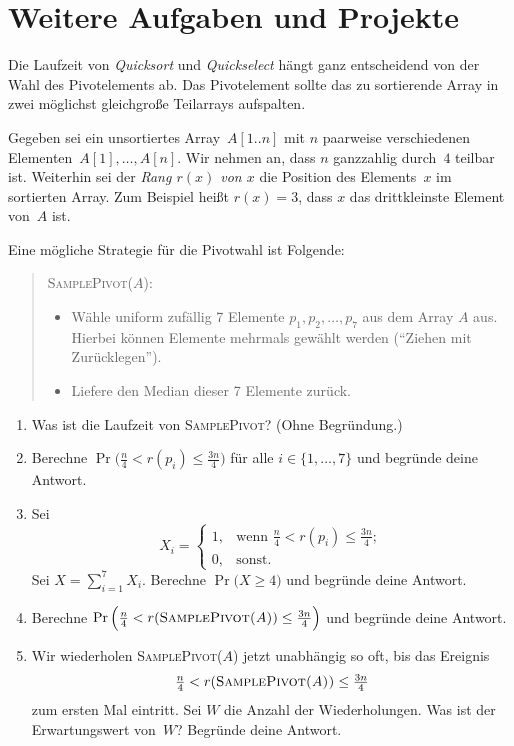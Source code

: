 \documentclass{uebung_cs}
\begin{document}
\section*{Weitere Aufgaben und Projekte}

\begin{exercise}
	Die Laufzeit von \textit{Quicksort} und \textit{Quickselect} hängt ganz entscheidend von der Wahl des Pivotelements ab.
	Das Pivotelement sollte das zu sortierende Array in zwei möglichst gleichgroße Teilarrays aufspalten.

	Gegeben sei ein unsortiertes Array~$A[1..n]$ mit $n$ paarweise verschiedenen Elementen~$A[1], \dots, A[n]$. Wir nehmen an, dass $n$ ganzzahlig durch~$4$ teilbar ist.
	Weiterhin sei der \emph{Rang $r(x)$ von $x$} die Position des Elements~$x$ im sortierten Array. Zum Beispiel heißt $r(x)=3$, dass $x$ das drittkleinste Element von~$A$ ist.

	Eine mögliche Strategie für die Pivotwahl ist Folgende:

	\begin{quote}
		\textsc{SamplePivot($A$):}
		\begin{itemize}
			\item Wähle uniform zufällig 7 Elemente $p_1,p_2,\dots,p_7$ aus dem Array $A$ aus. Hierbei können Elemente mehrmals gewählt werden (\enquote{Ziehen mit Zurücklegen}).
			\item Liefere den Median dieser 7 Elemente zurück.
		\end{itemize}
	\end{quote}
	\begin{enumerate}
		\item\easy Was ist die Laufzeit von \textsc{SamplePivot}? (Ohne Begründung.)
		\item\medium Berechne $\Pr\Big(\frac{n}{4}<r(p_i)\le\frac{3n}{4}\Big)$ für alle $i\in\{1,\dots,7\}$ und begründe deine Antwort.
		\item\hard Sei
		\[X_i=
		\begin{cases}
			1,&\text{wenn }
			\frac{n}{4}<r(p_i)\le\frac{3n}{4};\\
			0,&\text{sonst.}
		\end{cases}
		\]
		Sei $X=\sum_{i=1}^7 X_i$.
		Berechne $\Pr\big(X\ge 4\big)$ und begründe deine Antwort.
		\item\medium Berechne $\Pr\Big(\frac{n}{4}<r(\text{\textsc{SamplePivot($A$)}})\le\frac{3n}{4}\Big)$ und begründe deine Antwort.
		\item\medium Wir wiederholen \textsc{SamplePivot($A$)} jetzt unabhängig so oft, bis das Ereignis \[\tfrac{n}{4}<r(\text{\textsc{SamplePivot($A$))}}\le\tfrac{3n}{4}\] zum ersten Mal eintritt. Sei $W$ die Anzahl der Wiederholungen. Was ist der Erwartungswert von~$W$? Begründe deine Antwort.
	\end{enumerate}
\end{exercise}
\end{document}
